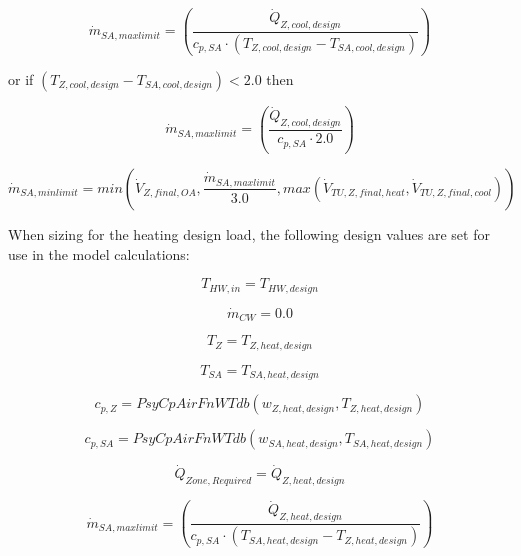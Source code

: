 \begin{equation}
  {\dot m_{SA,max limit}} = { \left(\frac{{\dot Q_{Z,cool,design } }}{{c_{p,SA}} \cdot {( {T_{Z,cool,design } } - {T_{SA,cool,design } } )}}  \right) }
\end{equation}  
  
or if \(({T_{Z,cool,design }} - {T_{SA,cool,design}}) < 2.0\) then

\begin{equation}
  {\dot m_{SA,max limit}} = { \left(\frac{{\dot Q_{Z,cool,design } }}{{c_{p,SA}} \cdot 2.0 } \right) }
\end{equation}

\begin{equation}
  {\dot m_{SA,min limit}} = min( {\dot V_{Z,final,OA} }, \frac{{\dot m_{SA,max limit}}}{3.0}, max({\dot V_{TU,Z,final,heat} } , {\dot V_{TU,Z,final,cool} }) )
\end{equation}

When sizing for the heating design load, the following design values are set for use in the model calculations:

\begin{equation}
  {T_{HW,in}} = {T_{HW,design}}
\end{equation}

\begin{equation}
  {\dot m_{CW}} = {0.0}
\end{equation}

\begin{equation}
  {T_{Z}} = {T_{Z,heat,design } }
\end{equation}

\begin{equation}
  {T_{SA}} = {T_{SA,heat,design}}
\end{equation}

\begin{equation}
  {c_{p,Z}} = {PsyCpAirFnWTdb ({w_{Z,heat,design } },  {T_{Z,heat,design } }  ) }
\end{equation}

\begin{equation}
  {c_{p,SA}} = {PsyCpAirFnWTdb ( {w_{SA,heat,design } },  {T_{SA,heat,design } }   ) }
\end{equation}

\begin{equation}
  {\dot Q_{Zone, Required}} = {\dot Q_{Z,heat,design } }
\end{equation}

\begin{equation}
  {\dot m_{SA,max limit}} = { \left(\frac{{\dot Q_{Z,heat,design } }}{{c_{p,SA}} \cdot ( {T_{SA,heat,design } } - {T_{Z,heat,design }} ) } \right) }
\end{equation}

